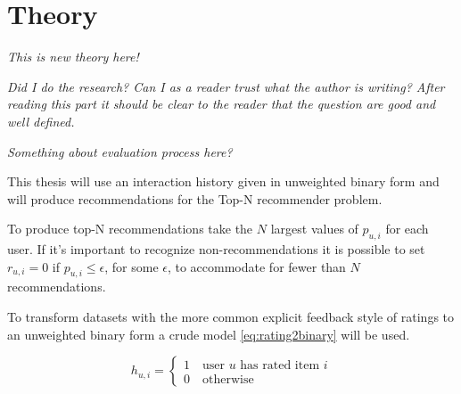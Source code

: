 \chapter{Theory}\label{cha:theory}

\textit{This is new theory here!}

\textit{Did I do the research? Can I as a reader trust what the author is writing? After reading this part it should be clear to the reader that the question are good and well defined.}

\textit{Something about evaluation process here?}


This thesis will use an interaction history given in unweighted binary form and will produce recommendations for the Top-N recommender problem.

To produce top-N recommendations take the $N$ largest values of $p_{u, i}$ for each user. If it's important to recognize non-recommendations it is possible to set $r_{u, i} = 0$ if $p_{u, i} \leq \epsilon$, for some $\epsilon$, to accommodate for fewer than $N$ recommendations.

To transform datasets with the more common explicit feedback style of ratings to an unweighted binary form a crude model \eqref{eq:rating2binary} will be used.

\begin{equation} \label{eq:rating2binary}
    h_{u, i} = \begin{cases}
        1 \quad \text{user $u$ has rated item $i$} \\
        0 \quad \text{otherwise}
    \end{cases}
\end{equation}

